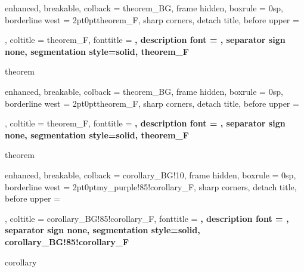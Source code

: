 


\makeatletter
{
	enhanced,
	breakable,
	colback = theorem_BG,
	frame hidden,
	boxrule = 0sp,
	borderline west = {2pt}{0pt}{theorem_F},
	sharp corners,
	detach title,
	before upper = \tcbtitle\par\smallskip,
	coltitle = theorem_F,
	fonttitle = \bfseries\sffamily,
	description font = \mdseries,
	separator sign none,
	segmentation style={solid, theorem_F}
}
{theorem}

{
	enhanced,
	breakable,
	colback = theorem_BG,
	frame hidden,
	boxrule = 0sp,
	borderline west = {2pt}{0pt}{theorem_F},
	sharp corners,
	detach title,
	before upper = \tcbtitle\par\smallskip,
	coltitle = theorem_F,
	fonttitle = \bfseries\sffamily,
	description font = \mdseries,
	separator sign none,
	segmentation style={solid, theorem_F}
}
{theorem}

{
	enhanced,
	breakable,
	colback = corollary_BG!10,
	frame hidden,
	boxrule = 0sp,
	borderline west = {2pt}{0pt}{my_purple!85!corollary_F},
	sharp corners,
	detach title,
	before upper = \tcbtitle\par\smallskip,
	coltitle = corollary_BG!85!corollary_F,
	fonttitle = \bfseries\sffamily,
	description font = \mdseries,
	separator sign none,
	segmentation style={solid, corollary_BG!85!corollary_F}
}
{corollary}

